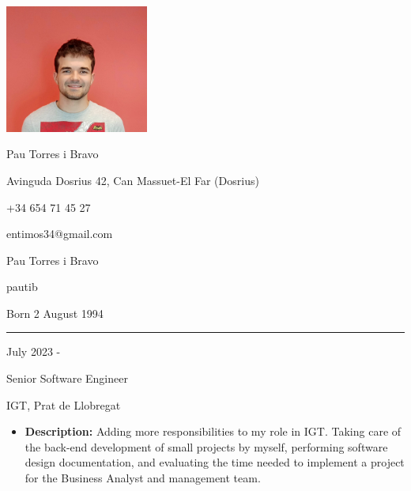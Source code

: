 \documentclass[a4paper,10pt]{article}
\newlength{\cvcolumngapwidth}
\newlength{\cvleftcolumnwidth}
\newlength{\cvrightcolumnwidth}
\newcommand{\cvnamestyle}[1]{{\Large\cvnamefont\textcolor{cvnamecolor}{#1}}}
\newcommand{\cvsectionstyle}[1]{{\normalsize\cvsectionfont\textcolor{cvsectioncolor}{#1}}}
\newcommand{\cvtitlestyle}[1]{{\large\cvtitlefont\textcolor{cvtitlecolor}{#1}}}
\newcommand{\cvdurationstyle}[1]{{\small\cvdurationfont\textcolor{cvdurationcolor}{#1}}}
\newlength{\cvafteritemskipamount}
\newlength{\cvaftersectionskipamount}
\newlength{\cvafternameskipamount}
\newlength{\cvafterpersonalinfolineskipamount}
\newlength{\cvaftertitleskipamount}
\newlength{\cvparskip}
\newcommand{\cvpersonalinfo}[2]{
    \begin{minipage}[t]{\cvleftcolumnwidth}
        \vspace{0mm} %
        \raggedleft #1
    \end{minipage}%
    \hspace{\cvcolumngapwidth}%
    \begin{minipage}[t]{\cvrightcolumnwidth}
        \vspace{0mm} %
        #2
    \end{minipage}

    \vspace{\cvafteritemskipamount}
}
\newcommand{\cvname}[1]{
    \cvnamestyle{#1}

    \vspace{\cvafternameskipamount}
}
\newcommand{\cvpersonalinfolinewithicon}[3]{
    \raisebox{.5\fontcharht\font`E-.5\height}{\texttt{[image: \#2]}}
    #3

    \vspace{\cvafterpersonalinfolineskipamount}
}
\newcommand{\cvsection}[1]{
    \begin{minipage}[t]{\cvleftcolumnwidth}
        \raggedleft\cvsectionstyle{#1}
    \end{minipage}%
    \hspace{\cvcolumngapwidth}%
    \begin{minipage}[t]{\cvrightcolumnwidth}
        \textcolor{cvrulecolor}{\rule{\cvrightcolumnwidth}{0.3mm}}
    \end{minipage}

    \vspace{\cvaftersectionskipamount}
}
\newcommand{\cvitem}[2]{
    \begin{minipage}[t]{\cvleftcolumnwidth}
        \raggedleft #1
    \end{minipage}%
    \hspace{\cvcolumngapwidth}%
    \begin{minipage}[t]{\cvrightcolumnwidth}
        \setlength{\parskip}{\cvparskip} #2
    \end{minipage}

    \vspace{\cvafteritemskipamount}
}
\newcommand{\cvtitle}[1]{
    \cvtitlestyle{#1}

    \vspace{\cvaftertitleskipamount}
    \vspace{-\cvparskip}
}
\begin{document}

\cvpersonalinfo{
    \includegraphics[height=42mm]{foto.jpg}
}{
    \cvname{Pau Torres i Bravo}

    \cvpersonalinfolinewithicon{height=4mm}{072-location.pdf}{
        Avinguda Dosrius 42, Can Massuet-El Far (Dosrius)
    }

    \cvpersonalinfolinewithicon{height=4mm}{067-phone.pdf}{
        +34 654 71 45 27
    }

    \cvpersonalinfolinewithicon{height=4mm}{070-envelop.pdf}{
        entimos34@gmail.com
    }

    \cvpersonalinfolinewithicon{height=4mm}{458-linkedin.pdf}{
        Pau Torres i Bravo
    }
    
    \cvpersonalinfolinewithicon{height=4mm}{github.png}{
        pautib
    }

    Born 2 August 1994
}



\cvsection{WORK EXPERIENCE}


\cvitem{
    \cvdurationstyle{July 2023 - 
    }
}{
    \cvtitle{Senior Software Engineer}
    
    IGT, Prat de Llobregat 
    \vspace{5pt}
    \begin{itemize}[leftmargin=*]
        \item \textbf{Description:} Adding more responsibilities to my role in IGT. Taking care of the back-end development of small projects by myself, performing software design documentation, and evaluating the time needed to implement a project for the Business Analyst and management team.
    \end{itemize}
}
\end{document}
